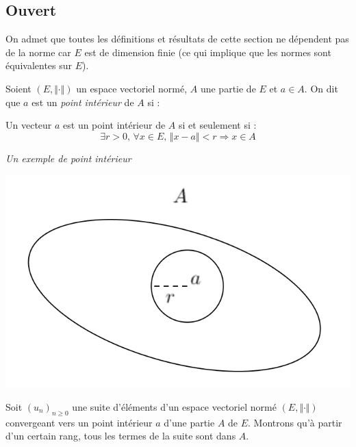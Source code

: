 \documentclass[french,11pt,twoside]{VcCours}
\begin{document}
\subsection{Ouvert}

\begin{Theoreme}{} On admet que toutes les définitions et résultats de cette section ne dépendent pas de la norme car $E$ est de dimension finie (ce qui implique que les normes sont équivalentes sur $E$).
\end{Theoreme}

\begin{Definition}{} Soient $(E, \Vert \cdot \Vert)$ un espace vectoriel normé, $A$ une partie de $E$ et $a \in A$. On dit que $a$ est un \emph{point intérieur} de $A$ si :

\vspace{1cm}
\end{Definition}

\begin{Remarque}{} Un vecteur $a$ est un point intérieur de $A$ si et seulement si :
$$ \exists r>0, \, \forall x \in E, \, \Vert x-a \Vert < r \Rightarrow x \in A$$
\end{Remarque}

\begin{center}
\emph{Un exemple de point intérieur}

\includegraphics[scale=0.5]{Ouvert}
\end{center}

\begin{Exemple} Soit $(u_n)_{n \geq 0}$ une suite d'éléments d'un espace vectoriel normé $(E, \Vert \cdot \Vert)$ convergeant vers un point intérieur $a$ d'une partie $A$ de $E$. Montrons qu'à partir d'un certain rang, tous les termes de la suite sont dans $A$.


\vspace{3cm}
%
\end{Exemple}
\end{document}
